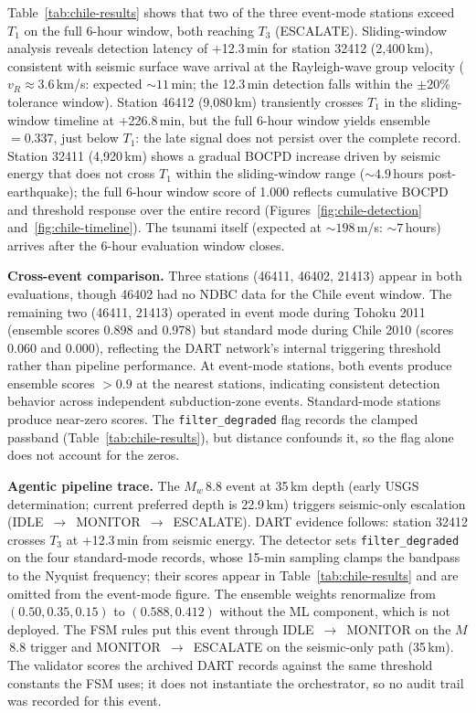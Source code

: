 \documentclass{article}
\begin{document}
Table~\ref{tab:chile-results} shows that two of the three event-mode
stations exceed $T_1$ on the full 6-hour window, both reaching
$T_3$ (ESCALATE).
Sliding-window analysis reveals detection latency of +12.3\,min for
station 32412 (2{,}400\,km), consistent with seismic surface wave
arrival at the Rayleigh-wave group velocity ($v_R \approx 3.6$\,km/s:
expected ${\sim}11$\,min; the 12.3\,min detection falls within the
$\pm$20\% tolerance window).
Station 46412 (9{,}080\,km) transiently crosses $T_1$ in the
sliding-window timeline at +226.8\,min, but the full 6-hour window
yields ensemble~$= 0.337$, just below $T_1$: the late signal does
not persist over the complete record.
Station 32411 (4{,}920\,km) shows a gradual BOCPD increase
driven by seismic energy that does not cross $T_1$ within the
sliding-window range (${\sim}4.9$\,hours post-earthquake); the full
6-hour window score of 1.000 reflects cumulative BOCPD and
threshold response over the entire record
(Figures~\ref{fig:chile-detection} and~\ref{fig:chile-timeline}).  The tsunami itself
(expected at ${\sim}198$\,m/s: ${\sim}7$\,hours) arrives
after the 6-hour evaluation window closes.

\noindent\textbf{Cross-event comparison.}
Three stations (46411, 46402, 21413) appear in both evaluations,
though 46402 had no NDBC data for the Chile event window.
The remaining two (46411, 21413) operated in event mode during
Tohoku 2011 (ensemble scores 0.898 and 0.978) but standard mode
during Chile 2010 (scores 0.060 and 0.000), reflecting the DART network's
internal triggering threshold rather than pipeline performance.
At event-mode stations, both events produce ensemble scores $> 0.9$
at the nearest stations, indicating consistent detection behavior
across independent subduction-zone events.
Standard-mode stations produce near-zero scores.  The
\texttt{filter\_degraded} flag records the clamped passband
(Table~\ref{tab:chile-results}), but distance confounds it, so the
flag alone does not account for the zeros.

\noindent\textbf{Agentic pipeline trace.}
The $M_w$\,8.8 event at 35\,km depth (early USGS determination;
current preferred depth is 22.9\,km) triggers seismic-only
escalation (IDLE~$\to$~MONITOR~$\to$~ESCALATE).  DART evidence follows:
station 32412 crosses $T_3$ at +12.3\,min from seismic energy.
The detector sets \texttt{filter\_degraded} on the four standard-mode
records, whose 15-min sampling clamps the bandpass to the Nyquist
frequency; their scores appear in Table~\ref{tab:chile-results} and
are omitted from the event-mode figure.  The ensemble weights renormalize
from $(0.50, 0.35, 0.15)$ to $(0.588, 0.412)$ without the ML
component, which is not deployed.
The FSM rules put this event through IDLE~$\to$~MONITOR on the
$M$\,8.8 trigger and MONITOR~$\to$~ESCALATE on the seismic-only path
(35\,km).  The validator scores the archived DART records against
the same threshold constants the FSM uses; it does not instantiate the
orchestrator, so no audit trail was recorded for this event.
\end{document}
